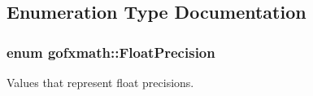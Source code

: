 \subsection{Enumeration Type Documentation}
\hypertarget{group___scalar_math_consts_ga4b1c9ff152a66c5d35b4767a57782f63}{}
\subsubsection[{Float\+Precision}]{\setlength{\rightskip}{0pt plus 5cm}enum {\bf gofxmath\+::\+Float\+Precision}}\label{group___scalar_math_consts_ga4b1c9ff152a66c5d35b4767a57782f63}


Values that represent float precisions. 

